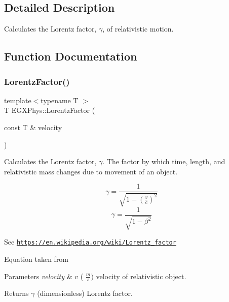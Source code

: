 \subsection{Detailed Description}
Calculates the Lorentz factor, $\gamma$, of relativistic motion. 

\subsection{Function Documentation}
\mbox{\label{group___e_g_x_phys-_lorentz_factor_ga5f9b11c1f4c3ae26a7e64f02c22d5a75}} 
\subsubsection{\texorpdfstring{Lorentz\+Factor()}{LorentzFactor()}}
{\footnotesize\ttfamily template$<$typename T $>$ \\
T E\+G\+X\+Phys\+::\+Lorentz\+Factor (\begin{DoxyParamCaption}\item[{const T \&}]{velocity }\end{DoxyParamCaption})}



Calculates the Lorentz factor, $\gamma$. The factor by which time, length, and relativistic mass changes due to movement of an object. 

\[\gamma=\frac{1}{\sqrt{1-(\frac{v}{c})^2}}\] \[\gamma=\frac{1}{\sqrt{1-\beta^2}}\]

See \href{https://en.wikipedia.org/wiki/Lorentz_factor}{\tt https\+://en.\+wikipedia.\+org/wiki/\+Lorentz\+\_\+factor}

Equation taken from


\begin{DoxyParams}{Parameters}
{\em velocity} & $v$ ( $\frac{m}{s})$ velocity of relativistic object. \\
\hline
\end{DoxyParams}
\begin{DoxyReturn}{Returns}
$\gamma$ (dimensionless) Lorentz factor. 
\end{DoxyReturn}
\mbox{\label{group___e_g_x_phys-_lorentz_factor_ga601de8c039be89a9abea22bc459436c9}} 
